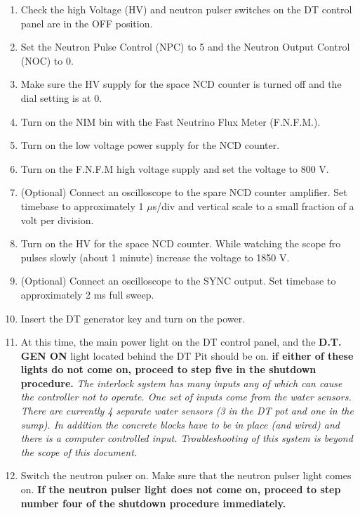 \begin{enumerate}
\item \CheckBox[name=dttop8]{} Check the high Voltage (HV) and neutron pulser switches on the DT control panel are in the OFF position.
\item \CheckBox[name=dttop9]{} Set the Neutron Pulse Control (NPC) to 5 and the Neutron Output Control (NOC) to 0.
\item \CheckBox[name=dttop10]{} Make sure the HV supply for the space NCD counter is turned off and the dial setting is at 0.
\item \CheckBox[name=dttop11]{} Turn on the NIM bin with the Fast Neutrino Flux Meter (F.N.F.M.).
\item \CheckBox[name=dttop12]{} Turn on the low voltage power supply for the NCD counter.
\item \CheckBox[name=dttop13]{} Turn on the F.N.F.M high voltage supply and set the voltage to 800 V.
\item \CheckBox[name=dttop14]{} (Optional) Connect an oscilloscope to the spare NCD counter amplifier. Set timebase to approximately 1 $\mu$s/div and vertical scale to a small fraction of a volt per division.
\item \CheckBox[name=dttop15]{} Turn on the HV for the space NCD counter. While watching the scope fro pulses slowly (about 1 minute) increase the voltage to 1850 V.
\item \CheckBox[name=dttop16]{} (Optional) Connect an oscilloscope to the SYNC output. Set timebase to approximately 2 ms full sweep.
\item \CheckBox[name=dttop17]{} Insert the DT generator key and turn on the power.
\item \CheckBox[name=dttop18]{} At this time, the main power light on the DT control panel, and the {\bf D.T. GEN ON} light located behind the DT Pit should be on. {\bf if either of these lights do not come on, proceed to step five in the shutdown procedure.} {\it The interlock system has many inputs any of which can cause the controller not to operate. One set of inputs come from the water sensors. There are currently 4 separate water sensors (3 in the DT pot and one in the sump). In addition the concrete blocks have to be in place (and wired) and there is a computer controlled input. Troubleshooting of this system is beyond the scope of this document.}
\item \CheckBox[name=dttop19]{} Switch the neutron pulser on. Make sure that the neutron pulser light comes on. {\bf If the neutron pulser light does not come on, proceed to step number four of the shutdown procedure immediately.}

\end{enumerate}
